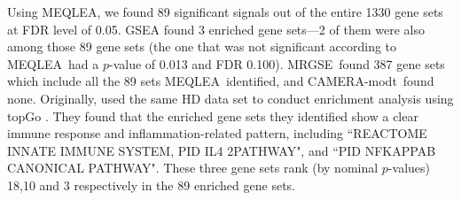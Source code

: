 \documentclass[a4,center,fleqn]{NAR}
\newcommand{\OurMethod}{MEQLEA}
\newcommand{\CMT}{CAMERA-modt}
\newcommand{\genr}{MRGSE}
\begin{document}
	
	Using \OurMethod, we found 89 significant signals out of the entire 1330 gene sets at FDR level
	of 0.05. GSEA found 3 enriched gene sets---2 of them were also among those 89 gene sets (the one
	that was not significant according to \OurMethod~had a $p$-value of 0.013 and FDR 0.100).
	\genr~found 387 gene sets which include all the 89 sets \OurMethod~identified, and \CMT~found none.
	Originally, \citet{labadorf2015rna} used the same HD data set to conduct enrichment analysis using
	topGo \citep{alexa2010topgo}. They found that the enriched gene sets they identified show a clear
	immune response and inflammation-related pattern, including ``REACTOME INNATE IMMUNE SYSTEM, PID IL4
	2PATHWAY", and ``PID NFKAPPAB CANONICAL PATHWAY". These three gene sets rank (by nominal
	$p$-values) 18,10 and 3 respectively in the 89 enriched gene sets.
	
\end{document}
